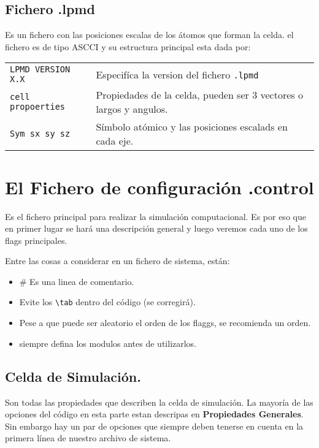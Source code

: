 \documentclass[a4paper,10pt]{scrbook}
\begin{document}
\subsection{Fichero .lpmd}

Es un fichero con las posiciones escalas de los \'atomos que forman la celda. el fichero es de tipo ASCCI y su estructura principal esta dada por:

\begin{center}
 \begin{tabular}{l|l}
 \verb|LPMD VERSION X.X | & Especif\'ica la version del fichero \verb|.lpmd| \\
 \verb|cell propoerties | & Propiedades de la celda, pueden ser 3 vectores o largos y angulos. \\
 \verb|Sym sx sy sz| & S\'imbolo at\'omico y las posiciones escalads en cada eje.\\
\end{tabular}

\end{center}


\section{El Fichero de configuraci\'on .control}

Es el fichero principal para realizar la simulaci\'on computacional. Es por eso que en primer lugar se har\'a una descripci\'on general y luego veremos cada uno de los flags principales.

Entre las cosas a considerar en un fichero de sistema, est\'an:

\begin{itemize}
 \item \# Es una linea de comentario.
 \item Evite los \verb|\tab| dentro del c\'odigo (se corregir\'a).
 \item Pese a que puede ser aleatorio el orden de los flaggs, se recomienda un orden.
 \item siempre defina los modulos antes de utilizarlos.
\end{itemize}

\subsection{Celda de Simulaci\'on.}

Son todas las propiedades que describen la celda de simulaci\'on. La mayor\'ia de las opciones del c\'odigo en esta parte estan descripas en \textbf{Propiedades Generales}. Sin embargo hay un par de opciones que siempre deben tenerse en cuenta en la primera l\'inea de nuestro archivo de sistema.
\end{document}
